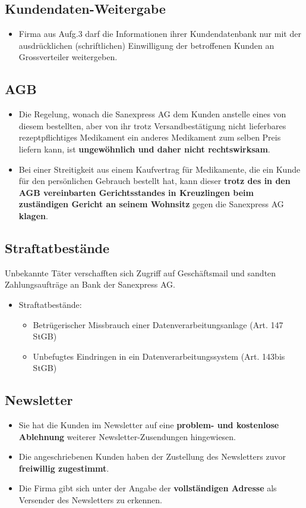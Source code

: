 \subsection{Kundendaten-Weitergabe}
\begin{itemize}
	\item Firma aus Aufg.3 darf die Informationen ihrer Kundendatenbank nur mit der ausdrücklichen (schriftlichen) Einwilligung der betroffenen Kunden an Grossverteiler weitergeben.
\end{itemize}

\subsection{AGB}
\begin{itemize}
	\item Die Regelung, wonach die Sanexpress AG dem Kunden anstelle eines von diesem bestellten, aber von ihr trotz Versandbestätigung nicht lieferbares rezeptpflichtiges Medikament ein anderes Medikament zum selben Preis liefern kann, ist \textbf{ungewöhnlich und daher nicht rechtswirksam}.
	\item Bei einer Streitigkeit aus einem Kaufvertrag für Medikamente, die ein Kunde für den persönlichen Gebrauch bestellt hat, kann dieser \textbf{trotz des in den AGB vereinbarten Gerichtsstandes in Kreuzlingen beim zuständigen Gericht an seinem Wohnsitz} gegen die Sanexpress AG \textbf{klagen}.
\end{itemize}

\subsection{Straftatbestände}
Unbekannte Täter verschafften sich Zugriff auf Geschäftsmail und sandten Zahlungsaufträge an Bank der Sanexpress AG.
\begin{itemize}
	\item Straftatbestände:
	\begin{itemize}
		\item Betrügerischer Missbrauch einer Datenverarbeitungsanlage (Art. 147 StGB)
		\item Unbefugtes Eindringen in ein Datenverarbeitungssystem (Art. 143bis StGB)
	\end{itemize}
\end{itemize}

\subsection{Newsletter}
\begin{itemize}
	\item Sie hat die Kunden im Newsletter auf eine \textbf{problem- und kostenlose Ablehnung} weiterer Newsletter-Zusendungen hingewiesen.
	\item Die angeschriebenen Kunden haben der Zustellung des Newsletters zuvor \textbf{freiwillig zugestimmt}.
	\item Die Firma gibt sich unter der Angabe der \textbf{vollständigen Adresse} als Versender des Newsletters zu erkennen.
\end{itemize}

